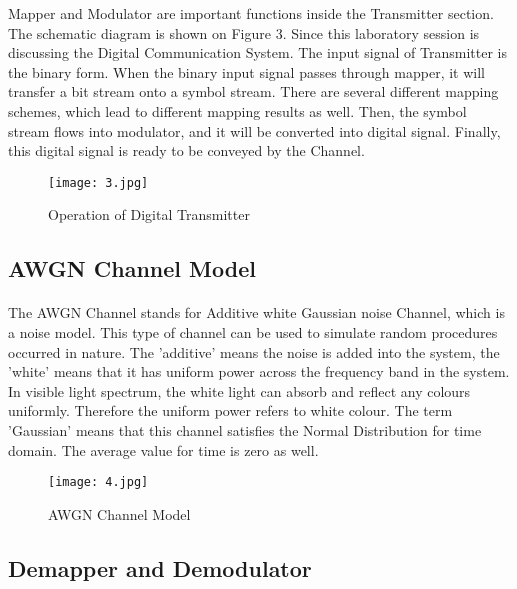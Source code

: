 \documentclass[12pt]{article}
\begin{document}
    Mapper and Modulator are important functions inside the Transmitter section. The schematic diagram is shown on Figure 3. Since this laboratory session is discussing the Digital Communication System. The input signal of Transmitter is the binary form. When the binary input signal passes through mapper, it will transfer a bit stream onto a symbol stream. There are several different mapping schemes, which lead to different mapping results as well. Then, the symbol stream flows into modulator, and it will be converted into digital signal. Finally, this digital signal is ready to be conveyed by the Channel.
    \begin{figure}[H]
    \centering
    \texttt{[image: 3.jpg]}
    \caption{Operation of Digital Transmitter}
    \end{figure}
    
    
    
    
    
    \subsection{AWGN Channel Model}
    \paragraph{}
    The AWGN Channel stands for Additive white Gaussian noise Channel, which is a noise model. This type of channel can be used to simulate random procedures occurred in nature. The 'additive' means the noise is added into the system, the 'white' means that it has uniform power across the frequency band in the system. In visible light spectrum, the white light can absorb and reflect any colours uniformly. Therefore the uniform power refers to white colour. The term 'Gaussian' means that this channel satisfies the Normal Distribution for time domain. The average value for time is zero as well\cite{2}. 
    \begin{figure}[H]
    \centering
    \texttt{[image: 4.jpg]}
    \caption{AWGN Channel Model}
    \end{figure}
    
    
    
    
    
    \subsection{Demapper and Demodulator}
\end{document}
